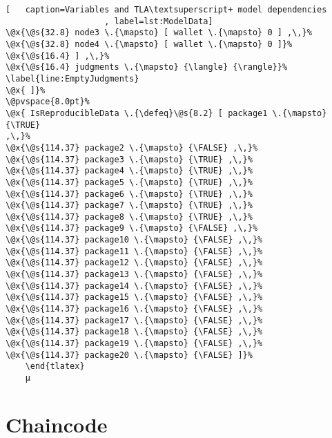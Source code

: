 \begin{lstlisting}[	  caption=Variables and TLA\textsuperscript+ model dependencies
					, label=lst:ModelData]
\@x{\@s{32.8} node3 \.{\mapsto} [ wallet \.{\mapsto} 0 ] ,\,}%
\@x{\@s{32.8} node4 \.{\mapsto} [ wallet \.{\mapsto} 0 ]}%
\@x{\@s{16.4} ] ,\,}%
\@x{\@s{16.4} judgments \.{\mapsto} {\langle} {\rangle}}%
\label{line:EmptyJudgments}
\@x{ ]}%
\@pvspace{8.0pt}%
\@x{ IsReproducibleData \.{\defeq}\@s{8.2} [ package1 \.{\mapsto} {\TRUE}
,\,}%
\@x{\@s{114.37} package2 \.{\mapsto} {\FALSE} ,\,}%
\@x{\@s{114.37} package3 \.{\mapsto} {\TRUE} ,\,}%
\@x{\@s{114.37} package4 \.{\mapsto} {\TRUE} ,\,}%
\@x{\@s{114.37} package5 \.{\mapsto} {\TRUE} ,\,}%
\@x{\@s{114.37} package6 \.{\mapsto} {\TRUE} ,\,}%
\@x{\@s{114.37} package7 \.{\mapsto} {\TRUE} ,\,}%
\@x{\@s{114.37} package8 \.{\mapsto} {\TRUE} ,\,}%
\@x{\@s{114.37} package9 \.{\mapsto} {\FALSE} ,\,}%
\@x{\@s{114.37} package10 \.{\mapsto} {\FALSE} ,\,}%
\@x{\@s{114.37} package11 \.{\mapsto} {\FALSE} ,\,}%
\@x{\@s{114.37} package12 \.{\mapsto} {\FALSE} ,\,}%
\@x{\@s{114.37} package13 \.{\mapsto} {\FALSE} ,\,}%
\@x{\@s{114.37} package14 \.{\mapsto} {\FALSE} ,\,}%
\@x{\@s{114.37} package15 \.{\mapsto} {\FALSE} ,\,}%
\@x{\@s{114.37} package16 \.{\mapsto} {\FALSE} ,\,}%
\@x{\@s{114.37} package17 \.{\mapsto} {\FALSE} ,\,}%
\@x{\@s{114.37} package18 \.{\mapsto} {\FALSE} ,\,}%
\@x{\@s{114.37} package19 \.{\mapsto} {\FALSE} ,\,}%
\@x{\@s{114.37} package20 \.{\mapsto} {\FALSE} ]}%
	\end{tlatex}
	µ
\end{lstlisting}

\section{Chaincode}
\label{subsec:ModelChaincode}

